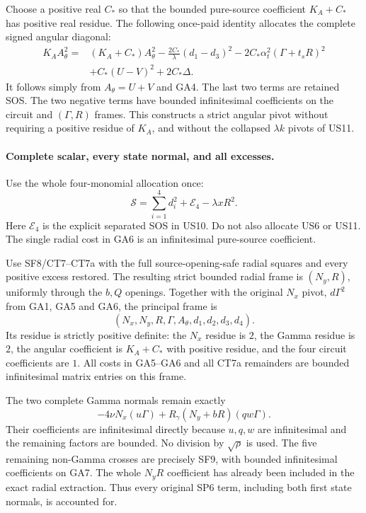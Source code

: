 Choose a positive real $C_*$ so that the bounded pure-source
coefficient $K_A+C_*$ has positive real residue. The following
once-paid identity allocates the complete signed angular diagonal:
\[
\boxed{\begin{aligned}
 K_AA_\theta^2={}&(K_A+C_*)A_\theta^2
  -\frac{2C_*}{\lambda}(d_1-d_3)^2
  -2C_*\alpha_t^2(\Gamma+t_sR)^2\\
 &+C_*(U-V)^2+2C_*\Delta.
\end{aligned}}\tag{GA5}
\]
It follows simply from $A_\theta=U+V$ and GA4. The last two terms
are retained SOS. The two negative terms have bounded
infinitesimal coefficients on the circuit and $(\Gamma,R)$ frames.
This constructs a strict angular pivot without requiring a positive
residue of $K_A$, and without the collapsed $\lambda k$ pivots of
US11.

\paragraph{Complete scalar, every state normal, and all excesses.}
Use the whole four-monomial allocation once:
\[
       \mathscr S=\sum_{i=1}^4d_i^2+\mathcal E_4
                                           -\lambda xR^2.
       \tag{GA6}
\]
Here $\mathcal E_4$ is the explicit separated SOS in US10. Do not
also allocate US6 or US11. The single radial cost in GA6 is an
infinitesimal pure-source coefficient.

Use SF8/CT7--CT7a with the full source-opening-safe radial squares
and every positive excess restored. The resulting strict bounded
radial frame is $(N_y,R)$, uniformly through the $b,Q$ openings.
Together with the original $N_x$ pivot, $d\Gamma^2$ from GA1,
GA5 and GA6, the principal frame is
\[
       (N_x,N_y,R,\Gamma,A_\theta,d_1,d_2,d_3,d_4).
       \tag{GA7}
\]
Its residue is strictly positive definite: the $N_x$ residue is
$2$, the Gamma residue is $2$, the angular coefficient is
$K_A+C_*$ with positive residue, and the four circuit coefficients
are $1$. All costs in GA5--GA6 and all CT7a remainders are bounded
infinitesimal matrix entries on this frame.

The two complete Gamma normals remain exactly
\[
      -4\nu N_x(u\Gamma)
       +R_\gamma(N_y+bR)(qw\Gamma).
       \tag{GA8}
\]
Their coefficients are infinitesimal directly because $u,q,w$ are
infinitesimal and the remaining factors are bounded. No division
by $\sqrt\rho$ is used. The five remaining non-Gamma crosses are
precisely SF9, with bounded infinitesimal coefficients on GA7.
The whole $N_yR$ coefficient has already been included in the
exact radial extraction. Thus every original SP6 term, including
both first state normals, is accounted for.

